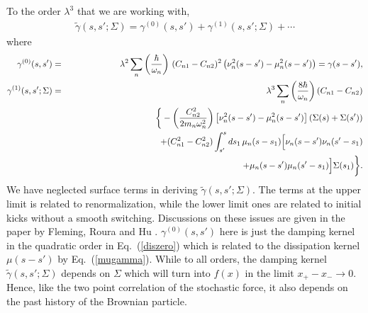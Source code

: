 \documentclass[%
amssymb,preprint,preprintnumbers,nofootinbib,superscriptaddress]{revtex4}
\begin{document}
To the order $\lambda^{3}$ that we are working with, 
\begin{eqnarray}
\tilde{\gamma}(s,s';\Sigma)=\gamma^{(0)}(s,s')+\gamma^{(1)}(s,s';\Sigma)+\cdots
\end{eqnarray}
where
\begin{eqnarray}
\gamma^{(0)}(s,s')&=&\lambda^{2}\sum_{n}\left(\frac{\hbar}{\omega_{n}}\right)\,(C_{n1}-C_{n2})^{2}\left(\nu_{n}^{2}(s-s')-\mu_{n}^{2}(s-s')\right)=\gamma(s-s'),\nonumber\\
\gamma^{(1)}(s,s';\Sigma)&=&\lambda^{3}\sum_{n}\left(\frac{8\hbar}{\omega_{n}}\right)(C_{n1}-C_{n2})\nonumber\\
&&\ \ \bigg\{-\left(\frac{C_{n2}^{2}}{2m_{n}\omega_{n}^{2}}\right)
\left[\nu_{n}^{2}(s-s')-\mu_{n}^{2}(s-s')\right]\left(\Sigma(s)+\Sigma(s')\right)\nonumber\\
&&\ \ \ \ \ \ \ +(C_{n1}^{2}-C_{n2}^{2})\int_{s'}^{s}ds_{1}\,\mu_{n}(s-s_{1})
\Big[\nu_{n}(s-s')\nu_{n}(s'-s_{1})\nonumber\\
&&\hskip 200pt+\mu_{n}(s-s')\mu_{n}(s'-s_{1})\Big]\Sigma(s_{1})\bigg\}.\nonumber\\
\end{eqnarray}
We have neglected surface terms in deriving $\tilde{\gamma}(s,s';\Sigma)$. The terms at the upper limit is related to renormalization, while the lower limit ones are related to initial kicks without a smooth switching. Discussions on these issues are given in the paper by Fleming, Roura and Hu \cite{FRH}.
$\gamma^{(0)}(s,s')$ here is just the damping kernel in the quadratic order in Eq.~(\ref{diszero}) which is related to the dissipation kernel $\mu(s-s')$ by Eq.~(\ref{mugamma}). While to all orders, the damping kernel $\tilde{\gamma}(s,s';\Sigma)$ depends on $\Sigma$ which will turn into $f(x)$ in the limit $x_{+}-x_{-}\rightarrow 0$. Hence, like the two point correlation of the stochastic force, it also depends on the past history of the Brownian particle.
\end{document}
